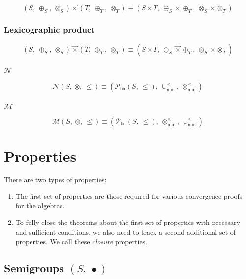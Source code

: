 \documentclass[10pt]{report}
\newcommand{\lexprod}{\ensuremath{\mathbin{\vec{\times}}}}
\newcommand{\minunion}{\mathbin{\cup_{\min}^{\leq}}}
\newcommand{\minlift}{\mathbin{\otimes_{\min}^{\leq}}}
\begin{document}
\[
(S,\ \oplus_S,\ \otimes_S) \lexprod (T,\ \oplus_T,\ \otimes_T) 
\equiv
(S\times T,\ \oplus_S\times\oplus_T,\ \otimes_S\times\otimes_T)
\]


\subsection{Lexicographic product} 

\[
(S,\ \oplus_S,\ \otimes_S) \lexprod (T,\ \oplus_T,\ \otimes_T) 
\equiv
(S\times T,\ \oplus_S\lexprod\oplus_T,\ \otimes_S\times\otimes_T)
\]


\subsection{$\mathcal{N}$}
\[
\mathcal{N}(S,\ \otimes,\ \leq) \equiv (\mathcal{P}_{\mathrm{fin}}(S,\ \leq),\ \minunion,\ \minlift)
\]


\subsection{$\mathcal{M}$}

\[
\mathcal{M}(S,\ \otimes,\ \leq) \equiv (\mathcal{P}_{\mathrm{fin}}(S,\ \leq),\ \minlift,\ \minunion)
\]







\chapter{Properties} 

There are two types of properties:
\begin{enumerate}
\item The first set of properties are those required for various convergence proofs for the algebras.
\item  To fully close the theorems about the first set of properties with necessary and sufficient conditions, we also need to track a second additional set of properties.  We call these \emph{closure} properties.
\end{enumerate}

\section{Semigroups $(S,\ \bullet)$} 
\end{document}
